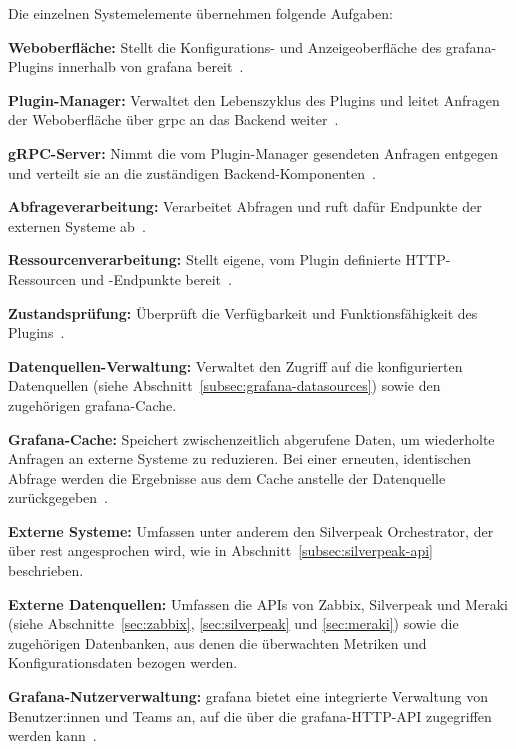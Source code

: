 Die einzelnen Systemelemente übernehmen folgende Aufgaben:
\begin{compactitem}
    \item \textbf{Weboberfläche:} Stellt die Konfigurations- und Anzeigeoberfläche des
    \gls{grafana}-Plugins innerhalb von \gls{grafana} bereit~\cite{grafana2026plugintools}.

    \item \textbf{Plugin-Manager:} Verwaltet den Lebenszyklus des Plugins und leitet
    Anfragen der Weboberfläche über \gls{grpc} an das Backend weiter~\cite{grafana2026backendplugins}.

    \item \textbf{gRPC-Server:} Nimmt die vom Plugin-Manager gesendeten Anfragen entgegen
    und verteilt sie an die zuständigen Backend-Komponenten~\cite{grafana2026backendplugins}.

    \item \textbf{Abfrageverarbeitung:} Verarbeitet Abfragen und ruft dafür Endpunkte der
    externen Systeme ab~\cite{grafana2026backendplugins}.

    \item \textbf{Ressourcenverarbeitung:} Stellt eigene, vom Plugin definierte
    HTTP-Ressourcen und -Endpunkte bereit~\cite{grafana2026backendplugins}.

    \item \textbf{Zustandsprüfung:} Überprüft die Verfügbarkeit und Funktionsfähigkeit
    des Plugins~\cite{grafana2026backendplugins}.

    \item \textbf{Datenquellen-Verwaltung:} Verwaltet den Zugriff auf die konfigurierten
    Datenquellen (siehe Abschnitt~\ref{subsec:grafana-datasources}) sowie den zugehörigen
    \gls{grafana}-Cache.

    \item \textbf{Grafana-Cache:} Speichert zwischenzeitlich abgerufene Daten, um wiederholte
    Anfragen an externe Systeme zu reduzieren. Bei einer erneuten, identischen Abfrage werden die
    Ergebnisse aus dem Cache anstelle der Datenquelle zurückgegeben~\cite{grafana2026datasourcecaching}.

    \item \textbf{Externe Systeme:} Umfassen unter anderem den Silverpeak Orchestrator, der
    über \gls{rest} angesprochen wird, wie in Abschnitt~\ref{subsec:silverpeak-api}
    beschrieben.

    \item \textbf{Externe Datenquellen:} Umfassen die APIs von Zabbix, Silverpeak und
    Meraki (siehe Abschnitte~\ref{sec:zabbix}, \ref{sec:silverpeak} und \ref{sec:meraki})
    sowie die zugehörigen Datenbanken, aus denen die überwachten Metriken und
    Konfigurationsdaten bezogen werden.

    \item \textbf{Grafana-Nutzerverwaltung:} \gls{grafana} bietet eine integrierte Verwaltung
    von Benutzer:innen und Teams an, auf die über die \gls{grafana}-HTTP-API zugegriffen werden
    kann~\cite{grafana2026usermanagement,grafana2026httpapi}.
\end{compactitem}

